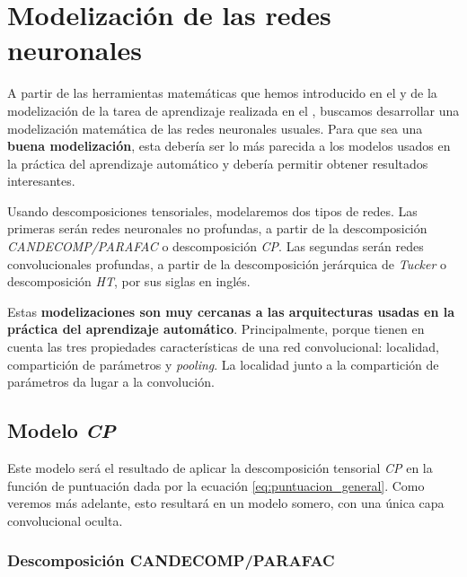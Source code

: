 \chapter{Modelización de las redes neuronales} \label{ch:modelizacion}

A partir de las herramientas matemáticas que hemos introducido en el   y de la modelización de la tarea de aprendizaje realizada en el , buscamos desarrollar una modelización matemática de las redes neuronales usuales. Para que sea una \textbf{buena modelización}, esta debería ser lo más parecida a los modelos usados en la práctica del aprendizaje automático y debería permitir obtener resultados interesantes.

Usando descomposiciones tensoriales, modelaremos dos tipos de redes. Las primeras serán redes neuronales no profundas, a partir de la descomposición \textit{CANDECOMP/PARAFAC} o descomposición \textit{CP}. Las segundas serán redes convolucionales profundas, a partir de la descomposición jerárquica de \textit{Tucker} o descomposición \textit{HT}, por sus siglas en inglés.

Estas \textbf{modelizaciones son muy cercanas a las arquitecturas usadas en la práctica del aprendizaje automático}. Principalmente, porque tienen en cuenta las tres propiedades características de una red convolucional: localidad, compartición de parámetros y \textit{pooling}. La localidad junto a la compartición de parámetros da lugar a la convolución.

\section{Modelo \textit{CP}}

Este modelo será el resultado de aplicar la descomposición tensorial \textit{CP} en la función de puntuación dada por la ecuación \eqref{eq:puntuacion_general}. Como veremos más adelante, esto resultará en un modelo somero, con una única capa convolucional oculta.

\subsection{Descomposición CANDECOMP/PARAFAC} \label{subs:descomposcion_cp}

